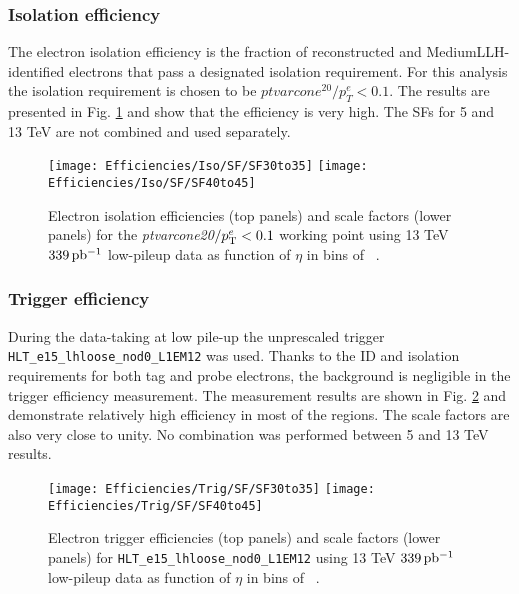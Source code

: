     \subsubsection{Isolation efficiency}
    The electron isolation efficiency is the fraction of reconstructed and MediumLLH-identified electrons that pass a designated isolation requirement. For this analysis the isolation requirement is chosen to be $ptvarcone^{20}/p_T^e<0.1$. The results are presented in Fig. \ref{fig:iso_sf_all} and show that the efficiency is very high. The SFs for 5 and 13 TeV are not combined and used separately.
    
    \begin{figure}[htbp]
    	\centering
    	\texttt{[image: Efficiencies/Iso/SF/SF30to35]}%
    	 \texttt{[image: Efficiencies/Iso/SF/SF40to45]} \\

    	\caption{Electron isolation efficiencies (top panels) and scale
    		factors (lower panels) for the \emph{ptvarcone20}$/p_{\text{T}}^e < 0.1$
    		working point using 13 TeV $339\,\mbox{pb\(^{-1}\)}$ low-pileup data as function
    		of $\eta$ in bins of \pt~\cite{int_note_electrons}.}
    	\label{fig:iso_sf_all}
    \end{figure}
    \subsubsection{Trigger efficiency}
    During the data-taking at low pile-up the unprescaled trigger \texttt{HLT\_e15\_lhloose\_nod0\_L1EM12} was used. Thanks to the ID and isolation requirements for both tag and probe electrons, the background is negligible in the trigger efficiency measurement. The measurement results are shown in Fig. \ref{fig:trig_sf_all} and demonstrate relatively high efficiency in most of the regions. The scale factors are also very close to unity. No combination was performed between 5 and 13 TeV results.
    
    \begin{figure}[htbp]
    	\centering
    	\texttt{[image: Efficiencies/Trig/SF/SF30to35]}
    	\texttt{[image: Efficiencies/Trig/SF/SF40to45]} \\
    	\caption{Electron trigger efficiencies (top panels) and scale
    		factors (lower panels) for \texttt{HLT\_e15\_lhloose\_nod0\_L1EM12}
    		using 13 TeV $339\,\mbox{pb\(^{-1}\)}$ low-pileup data as function
    		of $\eta$ in bins of \pt~\cite{int_note_electrons}.}
    	\label{fig:trig_sf_all}
    \end{figure}
    
